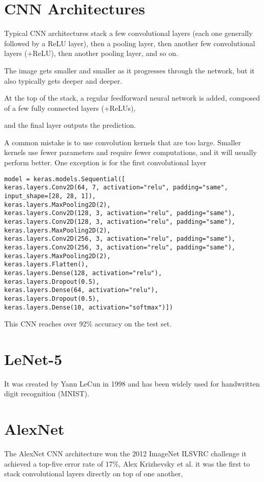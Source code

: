 \documentclass[11pt]{article}
\begin{document}
\section{CNN Architectures}
\label{sec:orgde8bdfb}
Typical CNN architectures stack a 
few convolutional layers (each one generally followed by a ReLU layer), 
then a pooling layer, 
then another few convolutional layers (+ReLU), 
then another pooling layer, 
and so on.

The image gets smaller and smaller as it progresses through the network,
but it also typically gets deeper and deeper. 

At the top of the stack, a regular feedforward neural network is added, 
composed of a few fully connected layers (+ReLUs), 

and the final layer outputs the prediction.

A common mistake is to use convolution kernels that are too large. 
Smaller kernels use fewer parameters and require fewer computations, and it will
usually perform better. One exception is for the first convolutional layer

\begin{verbatim}
model = keras.models.Sequential([
keras.layers.Conv2D(64, 7, activation="relu", padding="same", input_shape=[28, 28, 1]),
keras.layers.MaxPooling2D(2),
keras.layers.Conv2D(128, 3, activation="relu", padding="same"),
keras.layers.Conv2D(128, 3, activation="relu", padding="same"),
keras.layers.MaxPooling2D(2),
keras.layers.Conv2D(256, 3, activation="relu", padding="same"),
keras.layers.Conv2D(256, 3, activation="relu", padding="same"),
keras.layers.MaxPooling2D(2),
keras.layers.Flatten(),
keras.layers.Dense(128, activation="relu"),
keras.layers.Dropout(0.5),
keras.layers.Dense(64, activation="relu"),
keras.layers.Dropout(0.5),
keras.layers.Dense(10, activation="softmax")])
\end{verbatim}

This CNN reaches over 92\% accuracy on the test set. 
\section{LeNet-5}
\label{sec:org217d6ab}
It was created by Yann LeCun in 1998 and has been widely used for handwritten
digit recognition (MNIST). 
\section{AlexNet}
\label{sec:org40cab40}
The AlexNet CNN architecture won the 2012 ImageNet ILSVRC challenge 
it achieved a top-five error rate of 17\%, Alex Krizhevsky et al. 
it was the first to stack convolutional layers directly on top of one another,
\end{document}

